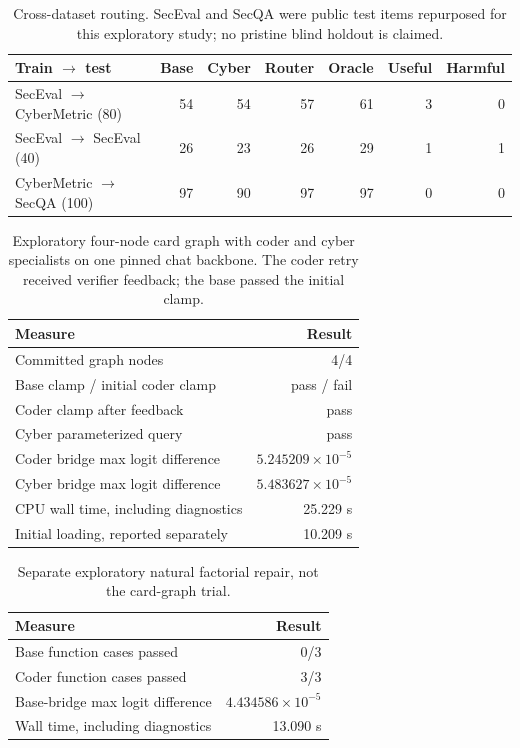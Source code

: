\begin{table}[ht]
\centering
\caption{Cross-dataset routing. SecEval and SecQA were public test items repurposed for this exploratory study; no pristine blind holdout is claimed.}
\label{tab:cross-dataset}
\begin{tabular}{lrrrrrr}
\toprule
Train $\rightarrow$ test & Base & Cyber & Router & Oracle & Useful & Harmful \\
\midrule
SecEval $\rightarrow$ CyberMetric (80) & 54 & 54 & 57 & 61 & 3 & 0 \\
SecEval $\rightarrow$ SecEval (40) & 26 & 23 & 26 & 29 & 1 & 1 \\
CyberMetric $\rightarrow$ SecQA (100) & 97 & 90 & 97 & 97 & 0 & 0 \\
\bottomrule
\end{tabular}
\end{table}
\begin{table}[ht]
\centering
\caption{Exploratory four-node card graph with coder and cyber specialists on one pinned chat backbone. The coder retry received verifier feedback; the base passed the initial clamp.}
\label{tab:coder-cyber-card}
\begin{tabular}{lr}
\toprule
Measure & Result \\
\midrule
Committed graph nodes & 4/4 \\
Base clamp / initial coder clamp & pass / fail \\
Coder clamp after feedback & pass \\
Cyber parameterized query & pass \\
Coder bridge max logit difference & $5.245209\times 10^{-5}$ \\
Cyber bridge max logit difference & $5.483627\times 10^{-5}$ \\
CPU wall time, including diagnostics & 25.229 s \\
Initial loading, reported separately & 10.209 s \\
\bottomrule
\end{tabular}
\end{table}

\begin{table}[ht]
\centering
\caption{Separate exploratory natural factorial repair, not the card-graph trial.}
\label{tab:natural-factorial}
\begin{tabular}{lr}
\toprule
Measure & Result \\
\midrule
Base function cases passed & 0/3 \\
Coder function cases passed & 3/3 \\
Base-bridge max logit difference & $4.434586\times 10^{-5}$ \\
Wall time, including diagnostics & 13.090 s \\
\bottomrule
\end{tabular}
\end{table}

